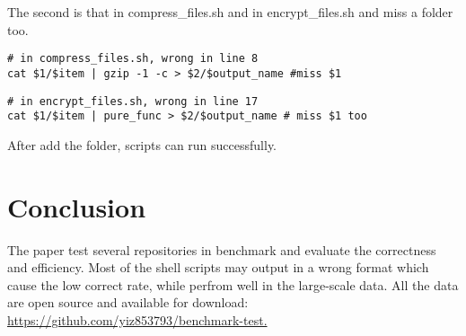 \documentclass[sigplan, screen, 10pt]{acmart}
\begin{document}
The second is that in compress\_files.sh and in encrypt\_files.sh and miss a folder too.
\begin{verbatim}
# in compress_files.sh, wrong in line 8
cat $1/$item | gzip -1 -c > $2/$output_name #miss $1
\end{verbatim}

\begin{verbatim}
# in encrypt_files.sh, wrong in line 17
cat $1/$item | pure_func > $2/$output_name # miss $1 too
\end{verbatim}
After add the folder, scripts can run successfully.

\section{Conclusion}
\label{conclusion}
The paper test several repositories in benchmark and evaluate the correctness and efficiency. Most of the shell scripts may output in a wrong format which cause the low correct rate, while perfrom well in the large-scale data. \newline
All the data are open source and available for download: \href{https://github.com/yiz853793/benchmark-test}{https://github.com/yiz853793/benchmark-test.}

{\small

}
\end{document}
